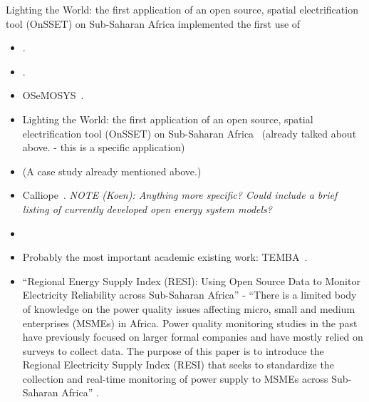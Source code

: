 \documentclass[conference, a4paper]{IEEEtran}
\begin{document}
Lighting the World: the first application of an open source, spatial electrification tool (OnSSET) on Sub-Saharan Africa
\citet{mentis-howells-ea-2017} \cite{mentis-howells-ea-2017} implemented the first use of 
\begin{itemize}
\item \cite{schlott-schyska-ea-2020}. 
\item \cite{phongtrakul-kongjeen-ea-2018}. 
\item OSeMOSYS~\cite{howells-rogner-ea-2011}.
\item Lighting the World: the first application of an open source, spatial electrification tool (OnSSET) on Sub-Saharan Africa~\cite{mentis-howells-ea-2017} (already talked about above. - this is a specific application)
\item \cite{menghwani-zerriffi-ea-2020} (A case study already mentioned above.)
\item Calliope~\cite{pfenninger-pickering-2018}. \emph{NOTE (Koen): Anything more specific? Could include a brief listing of currently developed open energy system models?}

\item {}

\item Probably the most important academic existing work: TEMBA~\cite{taliotis-shivakumar-ea-2016}.
\item ``Regional Energy Supply Index (RESI): Using Open Source Data to Monitor Electricity Reliability across Sub-Saharan Africa'' - ``There is a limited body of knowledge on the power quality issues affecting micro, small and medium enterprises (MSMEs) in Africa. Power quality monitoring studies in the past have previously focused on larger formal companies and have mostly relied on surveys to collect data. The purpose of this paper is to introduce the Regional Electricity Supply Index (RESI) that seeks to standardize the collection and real-time monitoring of power supply to MSMEs across Sub-Saharan Africa'' \cite{kitetu-mbutura-2020}.


\end{itemize}
\end{document}
